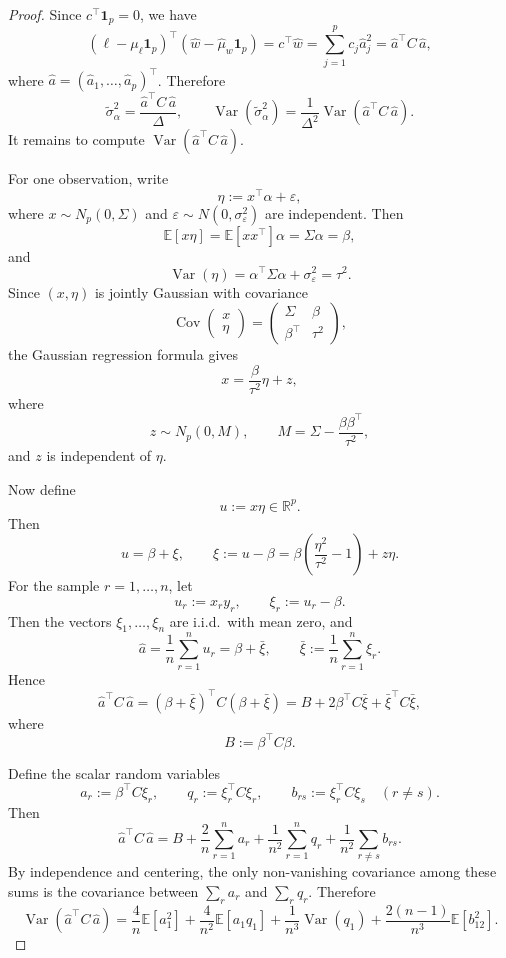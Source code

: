 \documentclass[11pt]{article}
\newcommand{\R}{\mathbb{R}}
\newcommand{\1}{\mathbf{1}}
\newcommand{\Var}{\operatorname{Var}}
\newcommand{\Cov}{\operatorname{Cov}}
\newcommand{\E}{\mathbb{E}}
\begin{document}
\begin{proof}
Since \(c^\top\1_p=0\), we have
\[
(\ell-\mu_\ell\1_p)^\top(\widehat w-\widehat\mu_w\1_p)
=
c^\top\widehat w
=
\sum_{j=1}^p c_j\widehat a_j^2
=
\widehat a^\top C\,\widehat a,
\]
where \(\widehat a=(\widehat a_1,\dots,\widehat a_p)^\top\). Therefore
\[
\widetilde{\sigma}_\alpha^2
=
\frac{\widehat a^\top C\,\widehat a}{\Delta},
\qquad
\Var(\widetilde{\sigma}_\alpha^2)
=
\frac{1}{\Delta^2}\Var(\widehat a^\top C\,\widehat a).
\]
It remains to compute \(\Var(\widehat a^\top C\,\widehat a)\).

\medskip

For one observation, write
\[
\eta:=x^\top\alpha+\varepsilon,
\]
where \(x\sim N_p(0,\Sigma)\) and \(\varepsilon\sim N(0,\sigma_\varepsilon^2)\) are independent. Then
\[
\E[x\eta]=\E[xx^\top]\alpha=\Sigma\alpha=\beta,
\]
and
\[
\Var(\eta)=\alpha^\top\Sigma\alpha+\sigma_\varepsilon^2=\tau^2.
\]
Since \((x,\eta)\) is jointly Gaussian with covariance
\[
\Cov\begin{pmatrix}x\\ \eta\end{pmatrix}
=
\begin{pmatrix}
\Sigma & \beta\\
\beta^\top & \tau^2
\end{pmatrix},
\]
the Gaussian regression formula gives
\[
x=\frac{\beta}{\tau^2}\eta+z,
\]
where
\[
z\sim N_p(0,M),\qquad
M=\Sigma-\frac{\beta\beta^\top}{\tau^2},
\]
and \(z\) is independent of \(\eta\).

Now define
\[
u:=x\eta\in\R^p.
\]
Then
\[
u=\beta+\xi,
\qquad
\xi:=u-\beta
=\beta\left(\frac{\eta^2}{\tau^2}-1\right)+z\eta.
\]
For the sample \(r=1,\dots,n\), let
\[
u_r:=x_r y_r,\qquad
\xi_r:=u_r-\beta.
\]
Then the vectors \(\xi_1,\dots,\xi_n\) are i.i.d.\ with mean zero, and
\[
\widehat a
=
\frac{1}{n}\sum_{r=1}^n u_r
=
\beta+\bar\xi,
\qquad
\bar\xi:=\frac{1}{n}\sum_{r=1}^n \xi_r.
\]
Hence
\[
\widehat a^\top C\,\widehat a
=
(\beta+\bar\xi)^\top C(\beta+\bar\xi)
=
B+2\beta^\top C\bar\xi+\bar\xi^\top C\bar\xi,
\]
where
\[
B:=\beta^\top C\beta.
\]

Define the scalar random variables
\[
a_r:=\beta^\top C\xi_r,\qquad
q_r:=\xi_r^\top C\xi_r,\qquad
b_{rs}:=\xi_r^\top C\xi_s\quad (r\neq s).
\]
Then
\[
\widehat a^\top C\,\widehat a
=
B+\frac{2}{n}\sum_{r=1}^n a_r
+\frac{1}{n^2}\sum_{r=1}^n q_r
+\frac{1}{n^2}\sum_{r\neq s} b_{rs}.
\]
By independence and centering, the only non-vanishing covariance among these sums is the covariance between \(\sum_r a_r\) and \(\sum_r q_r\). Therefore
\begin{equation}\label{eq:master}
\Var(\widehat a^\top C\,\widehat a)
=
\frac{4}{n}\E[a_1^2]
+\frac{4}{n^2}\E[a_1q_1]
+\frac{1}{n^3}\Var(q_1)
+\frac{2(n-1)}{n^3}\E[b_{12}^2].
\end{equation}


\end{proof}
\end{document}

